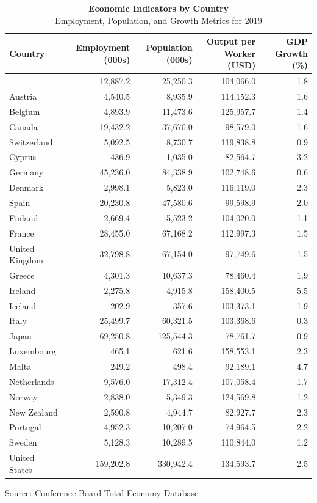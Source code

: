 \documentclass[
  12pt,
  letterpaper,
]{article}
\begin{document}
\begin{table}
\caption*{
{\large \textbf{Economic Indicators by Country}} \\ 
{\small Employment, Population, and Growth Metrics for 2019}
} 
\fontsize{9.0pt}{10.8pt}\selectfont
\begin{tabular*}{\linewidth}{@{\extracolsep{\fill}}lrrrr}
\toprule
Country & Employment (000s) & Population (000s) & Output per Worker (USD) & GDP Growth (\%) \\ 
\midrule\addlinespace[2.5pt]
{Australia} & {12,887.2} & {25,250.3} & {104,066.0} & {1.8} \\ 
Austria & 4,540.5 & 8,935.9 & 114,152.3 & 1.6 \\ 
Belgium & 4,893.9 & 11,473.6 & 125,957.7 & 1.4 \\ 
Canada & 19,432.2 & 37,670.0 & 98,579.0 & 1.6 \\ 
Switzerland & 5,092.5 & 8,730.7 & 119,838.8 & 0.9 \\ 
Cyprus & 436.9 & 1,035.0 & 82,564.7 & 3.2 \\ 
Germany & 45,236.0 & 84,338.9 & 102,748.6 & 0.6 \\ 
Denmark & 2,998.1 & 5,823.0 & 116,119.0 & 2.3 \\ 
Spain & 20,230.8 & 47,580.6 & 99,598.9 & 2.0 \\ 
Finland & 2,669.4 & 5,523.2 & 104,020.0 & 1.1 \\ 
France & 28,455.0 & 67,168.2 & 112,997.3 & 1.5 \\ 
United Kingdom & 32,798.8 & 67,154.0 & 97,749.6 & 1.5 \\ 
Greece & 4,301.3 & 10,637.3 & 78,460.4 & 1.9 \\ 
Ireland & 2,275.8 & 4,915.8 & 158,400.5 & 5.5 \\ 
Iceland & 202.9 & 357.6 & 103,373.1 & 1.9 \\ 
Italy & 25,499.7 & 60,321.5 & 103,368.6 & 0.3 \\ 
Japan & 69,250.8 & 125,544.3 & 78,761.7 & 0.9 \\ 
Luxembourg & 465.1 & 621.6 & 158,553.1 & 2.3 \\ 
Malta & 249.2 & 498.4 & 92,189.1 & 4.7 \\ 
Netherlands & 9,576.0 & 17,312.4 & 107,058.4 & 1.7 \\ 
Norway & 2,838.0 & 5,349.3 & 124,569.8 & 1.2 \\ 
New Zealand & 2,590.8 & 4,944.7 & 82,927.7 & 2.3 \\ 
Portugal & 4,952.3 & 10,207.0 & 74,964.5 & 2.2 \\ 
Sweden & 5,128.3 & 10,289.5 & 110,844.0 & 1.2 \\ 
United States & 159,202.8 & 330,942.4 & 134,593.7 & 2.5 \\ 
\bottomrule
\end{tabular*}
\begin{minipage}{\linewidth}
Source: Conference Board Total Economy Database\\
\end{minipage}
\end{table}
\end{document}
